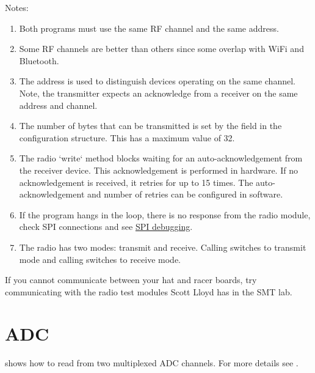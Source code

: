 Notes:
%
\begin{enumerate}
\item Both programs must use the same RF channel and the same address.

\item Some RF channels are better than others since some overlap with
  WiFi and Bluetooth.

\item The address is used to distinguish devices operating on the same
  channel. Note, the transmitter expects an acknowledge from a
  receiver on the same address and channel.

\item The number of bytes that can be transmitted is set by the
   field in the configuration structure.  This has a
  maximum value of 32.

\item The radio `write` method blocks waiting for an
  auto-acknowledgement from the receiver device. This acknowledgement
  is performed in hardware. If no acknowledgement is received, it
  retries for up to 15 times. The auto-acknowledgement and number of
  retries can be configured in software.

\item If the program hangs in the  loop, there is no
  response from the radio module, check SPI connections and see
  \hyperref[debugging-spi]{SPI debugging}.

\item The radio has two modes: transmit and receive.  Calling
   switches to transmit mode and calling
   switches to receive mode.

\end{enumerate}

If you cannot communicate between your hat and racer boards, try
communicating with the radio test modules Scott Lloyd has in the SMT
lab.


\section{ADC}
\label{ADC}

 shows
how to read from two multiplexed ADC channels.  For more details see
.

\inputminted{C}{../../src/test-apps/adc_usb_serial_test2/adc_usb_serial_test2.c}


